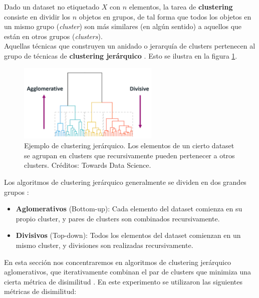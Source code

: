 Dado un dataset no etiquetado $X$ con $n$ elementos, la tarea de \textbf{clustering} \cite{Jain88} consiste en dividir los $n$ objetos en grupos, de tal forma que todos los objetos en un mismo grupo (\textit{cluster}) son más similares (en algún sentido) a aquellos que están en otros grupos (\textit{clusters}). \\

Aquellas técnicas que construyen un anidado o jerarquía de clusters pertenecen al grupo de técnicas de \textbf{clustering jerárquico} \cite{Jain88} \cite{clustering}. Esto se ilustra en la figura \ref{fig:jerarquico}. \\

\begin{figure}[h!]
\begin{center}
 \includegraphics[width=0.6\textwidth]{Kap5/jerarquico.png}
\end{center}

\caption{Ejemplo de clustering jerárquico. Los elementos de un cierto dataset se agrupan en clusters que recursivamente pueden pertenecer a otros clusters. Créditos: Towards Data Science.}
\label{fig:jerarquico}
\end{figure}

Los algoritmos de clustering jerárquico generalmente se dividen en dos grandes grupos \cite{clustering} \cite{iretrieval} :

\begin{itemize}
\item \textbf{Aglomerativos} (Bottom-up): Cada elemento del dataset comienza en su propio cluster, y pares de clusters son combinados recursivamente.
\item \textbf{Divisivos} (Top-down):  Todos los elementos del dataset comienzan en un mismo cluster, y divisiones son realizadas recursivamente.
\end{itemize}

En esta sección nos concentraremos en algoritmos de clustering jerárquico aglomerativos, que iterativamente combinan el par de clusters que minimiza una cierta métrica de disimilitud \cite{clustering}. En este experimento se utilizaron las siguientes métricas de disimilitud:


